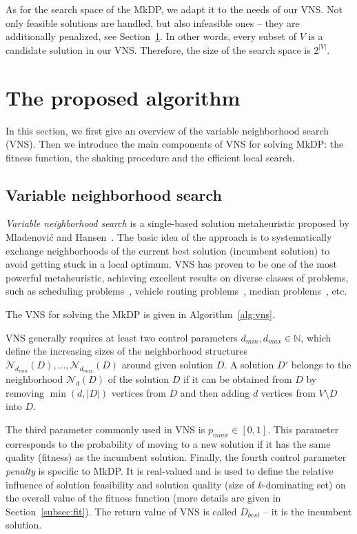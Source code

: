 \documentclass[dvipsnames,format=sigconf]{acmart} %
\begin{document}
As for the search space of the MkDP, we adapt it to the needs of our VNS. Not only feasible solutions are handled, but also infeasible ones -- they are additionally penalized, see Section~\ref{sec:vns}. In other words, every subset of $V$ is a candidate solution in our VNS. Therefore, the size of the search space is $2^{|V|}$. 
   
   
\section{The proposed algorithm}\label{sec:vns}

In this section, we first give an overview of the variable neighborhood search (VNS). Then we introduce the main components of VNS for solving MkDP: the fitness function, the shaking procedure and the efficient local search.
 
  \subsection{Variable neighborhood search}
 \emph{Variable neighborhood search} is a single-based solution metaheuristic proposed by Mladenović and Hansen~\cite{mladenovic1997variable}. The basic idea of the approach is to systematically exchange neighborhoods of the current best solution (incumbent solution) to avoid getting stuck in a local optimum. VNS has proven to be one of the most powerful metaheuristic, achieving excellent results on diverse classes of problems, such as scheduling problems~\cite{fleszar2004solving}, vehicle routing problems~\cite{rezgui2019application}, median problems~\cite{herran2019variable}, etc.  
  
 The VNS for solving the MkDP is given in Algorithm~\ref{alg:vns}. 
 
 VNS generally requires at least two control parameters $d_{min}, d_{max} \in \mathbb{N}$, which define the increasing sizes of the neighborhood structures $\mathcal{N}_{d_{min}}(D), \ldots, \mathcal{N}_{d_{max}}(D)$ around given solution $D$. A solution $D'$ belongs to the neighborhood $\mathcal{N}_{d}(D)$ of the solution $D$ if it can be obtained from $D$ by removing $\min(d, |D|)$ vertices from $D$ and then adding $d$ vertices from $V \setminus D$ into $D$.
 
 The third parameter commonly used in VNS is $p_{move} \in [0, 1]$. This parameter corresponds to the probability of moving to a new solution if it has the same quality (fitness) as the incumbent solution. 
 Finally, the fourth control parameter \emph{penalty} is specific to MkDP. It is real-valued and is used to define the relative influence of solution feasibility and solution quality (size of $k$-dominating set) on the overall value of the fitness function (more details are given in Section~\ref{subsec:fit}).
 The return value of VNS is called $D_{best}$ -- it is the incumbent solution. 
  
\end{document}
